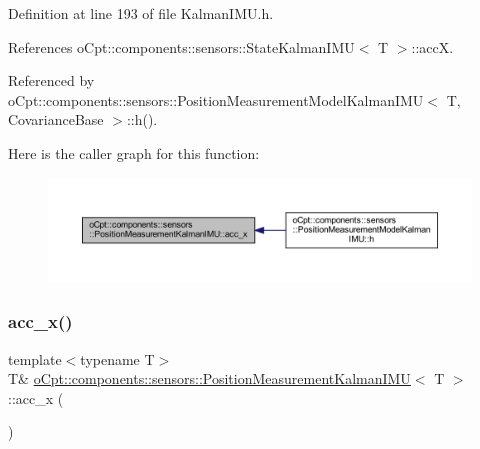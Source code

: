 Definition at line 193 of file Kalman\+I\+M\+U.\+h.



References o\+Cpt\+::components\+::sensors\+::\+State\+Kalman\+I\+M\+U$<$ T $>$\+::accX.



Referenced by o\+Cpt\+::components\+::sensors\+::\+Position\+Measurement\+Model\+Kalman\+I\+M\+U$<$ T, Covariance\+Base $>$\+::h().

Here is the caller graph for this function\+:
\nopagebreak
\begin{figure}[H]
\begin{center}
\leavevmode
\includegraphics[width=350pt]{classo_cpt_1_1components_1_1sensors_1_1_position_measurement_kalman_i_m_u_a511c5c331629625c81e3c4e81ecd9128_icgraph}
\end{center}
\end{figure}
\hypertarget{classo_cpt_1_1components_1_1sensors_1_1_position_measurement_kalman_i_m_u_a9a2401716413c2c33aca9992ceb7a78f}{}\label{classo_cpt_1_1components_1_1sensors_1_1_position_measurement_kalman_i_m_u_a9a2401716413c2c33aca9992ceb7a78f} 
\subsubsection{\texorpdfstring{acc\+\_\+x()}{acc\_x()}\hspace{0.1cm}{\footnotesize\ttfamily [2/2]}}
{\footnotesize\ttfamily template$<$typename T$>$ \\
T\& \hyperlink{classo_cpt_1_1components_1_1sensors_1_1_position_measurement_kalman_i_m_u}{o\+Cpt\+::components\+::sensors\+::\+Position\+Measurement\+Kalman\+I\+MU}$<$ T $>$\+::acc\+\_\+x (\begin{DoxyParamCaption}{ }\end{DoxyParamCaption})\hspace{0.3cm}{\ttfamily [inline]}}



